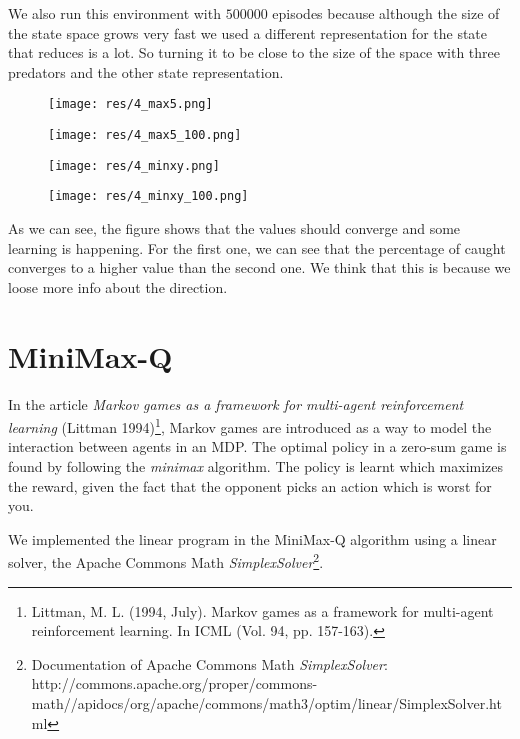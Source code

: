 \documentclass{article}
\begin{document}
We also run this environment with $500000$ episodes because although the size of
the state space grows very fast we used a different representation for the
state that reduces is a lot. So turning it to be close to the size of the space
with three predators and the other state representation.

\begin{figure}[htbp]
	\centering
	\begin{minipage}[t]{.45\linewidth}
		\centering
		\texttt{[image: res/4\_max5.png]}
	\end{minipage}
	\begin{minipage}[t]{.45\linewidth}
		\centering
		\texttt{[image: res/4\_max5\_100.png]}
	\end{minipage}
\end{figure}

\begin{figure}[htbp]
	\centering
	\begin{minipage}[t]{.45\linewidth}
		\centering
		\texttt{[image: res/4\_minxy.png]}
	\end{minipage}
	\begin{minipage}[t]{.45\linewidth}
		\centering
		\texttt{[image: res/4\_minxy\_100.png]}
	\end{minipage}
\end{figure}

As we can see, the figure shows that the values should converge and some
learning is happening. For the first one, we can see that the percentage of
caught converges to a higher value than the second one. We think that this is
because we loose more info about the direction. 
\section{MiniMax-Q}
In the article \emph{Markov games as a framework for multi-agent reinforcement learning} (Littman 1994)\footnote{Littman, M. L. (1994, July). Markov games as a framework for multi-agent reinforcement learning. In ICML (Vol. 94, pp. 157-163).}, Markov games are introduced as a way to model the interaction between agents in an MDP. The optimal policy in a zero-sum game is found by following the \emph{minimax} algorithm. The policy is learnt which maximizes the reward, given the fact that the opponent picks an action which is worst for you.

We implemented the linear program in the MiniMax-Q algorithm using a linear solver, the Apache Commons Math \emph{SimplexSolver}\footnote{Documentation of Apache Commons Math \emph{SimplexSolver}: http://commons.apache.org/proper/commons-math//apidocs/org/apache/commons/math3/optim/linear/SimplexSolver.html}.
\end{document}
